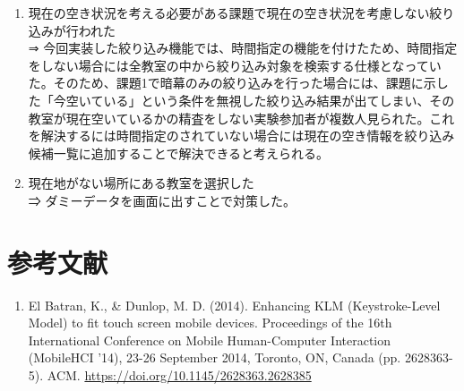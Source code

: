 \documentclass[12pt,a4paper,dvipdf]{jsarticle}
\begin{document}
\begin{enumerate}
    \item 現在の空き状況を考える必要がある課題で現在の空き状況を考慮しない絞り込みが行われた\\
          ⇒ 今回実装した絞り込み機能では、時間指定の機能を付けたため、時間指定をしない場合には全教室の中から絞り込み対象を検索する仕様となっていた。そのため、課題1で暗幕のみの絞り込みを行った場合には、課題に示した「今空いている」という条件を無視した絞り込み結果が出てしまい、その教室が現在空いているかの精査をしない実験参加者が複数人見られた。これを解決するには時間指定のされていない場合には現在の空き情報を絞り込み候補一覧に追加することで解決できると考えられる。
    \item 現在地がない場所にある教室を選択した\\
          ⇒ ダミーデータを画面に出すことで対策した。
\end{enumerate}
\section{参考文献}
\begin{enumerate}
    \item El Batran, K., \& Dunlop, M. D. (2014). Enhancing KLM (Keystroke-Level Model) to fit touch screen mobile devices. Proceedings of the 16th International Conference on Mobile Human-Computer Interaction (MobileHCI '14), 23-26 September 2014, Toronto, ON, Canada (pp. 2628363-5). ACM. \url{https://doi.org/10.1145/2628363.2628385}
\end{enumerate}
\end{document}
